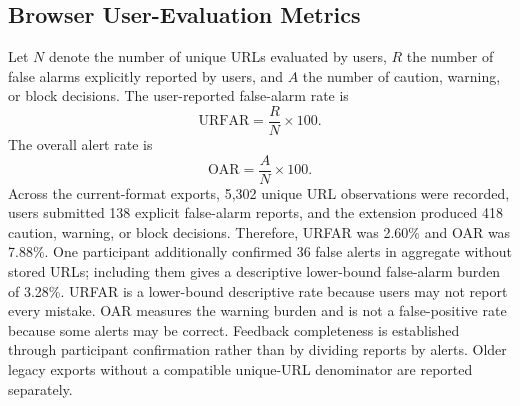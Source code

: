 \subsection{Browser User-Evaluation Metrics}

Let $N$ denote the number of unique URLs evaluated by users, $R$ the number of
false alarms explicitly reported by users, and $A$ the number of caution,
warning, or block decisions. The user-reported false-alarm rate is
\begin{equation}
    \mathrm{URFAR}=\frac{R}{N}\times100.
\end{equation}
The overall alert rate is
\begin{equation}
    \mathrm{OAR}=\frac{A}{N}\times100.
\end{equation}
Across the current-format exports, 5,302 unique URL observations were recorded,
users submitted 138 explicit false-alarm reports, and the extension produced
418 caution, warning, or block decisions. Therefore, URFAR was 2.60\% and OAR
was 7.88\%. One participant additionally confirmed 36 false alerts in
aggregate without stored URLs; including them gives a descriptive lower-bound
false-alarm burden of 3.28\%. URFAR is a
lower-bound descriptive rate because users may not report every mistake. OAR
measures the warning burden and is not a false-positive rate because some
alerts may be correct. Feedback completeness is established through participant
confirmation rather than by dividing reports by alerts. Older legacy exports
without a compatible unique-URL denominator are reported separately.
